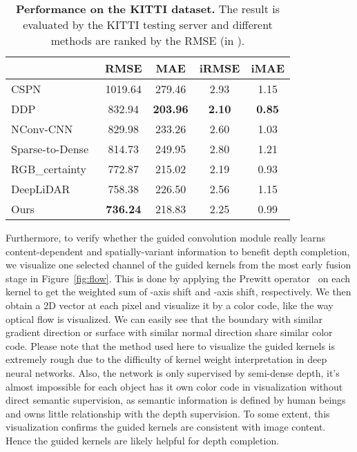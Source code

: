 \documentclass[journal]{IEEEtran}
\begin{document}
\begin{table}
   \begin{center}
   \caption{{\bf Performance on the KITTI dataset.} The result is evaluated by the KITTI testing server and different methods are ranked by the RMSE (in ).} \label{tab:kitti_result}
   \small
   \begin{tabular}{l|c|c|c|c} \hline
    & \textbf{RMSE}   & MAE   & iRMSE & iMAE \\ \hline
   CSPN~\cite{depth_affinity,cspn_journal} & 1019.64 & 279.46 & 2.93  & 1.15 \\
   DDP~\cite{ddp} & 832.94 & \textbf{203.96} & \textbf{2.10} & \textbf{0.85} \\
   NConv-CNN~\cite{cnn_confidence} & 829.98 & 233.26 & 2.60 & 1.03 \\
   Sparse-to-Dense~\cite{self_supervised} & 814.73 & 249.95 & 2.80 & 1.21 \\
   RGB\_certainty~\cite{sparse_noisy} & 772.87 & 215.02 & 2.19  & 0.93 \\
   DeepLiDAR~\cite{deep_lidar} & 758.38 & 226.50 & 2.56 & 1.15 \\  \hline
   Ours & \textbf{736.24} & 218.83 & 2.25 & 0.99 \\ \hline
   \end{tabular}
   \end{center}
\end{table}

Furthermore, to verify whether the guided convolution module really learns content-dependent and spatially-variant information to benefit depth completion,
we visualize one selected channel of the guided kernels  from the most early fusion stage in Figure~\ref{fig:flow}. 
This is done by applying the Prewitt operator~\cite{prewitt} on each  kernel to get the weighted sum of -axis shift and -axis shift, respectively.
We then obtain a 2D vector at each pixel and visualize it by a color code, like the way optical flow is visualized.
We can easily see that the boundary with similar gradient direction or surface with similar normal direction share similar color code. 
Please note that the method used here to visualize the guided kernels is extremely rough due to the difficulty of kernel weight interpretation in deep neural networks.
Also, the network is only supervised by semi-dense depth,
it's almost impossible for each object has it own color code in visualization without direct semantic supervision,
as semantic information is defined by human beings and owns little relationship with the depth supervision.  
To some extent, this visualization confirms the guided kernels are consistent with image content.
Hence the guided kernels are likely helpful for depth completion.
\end{document}
